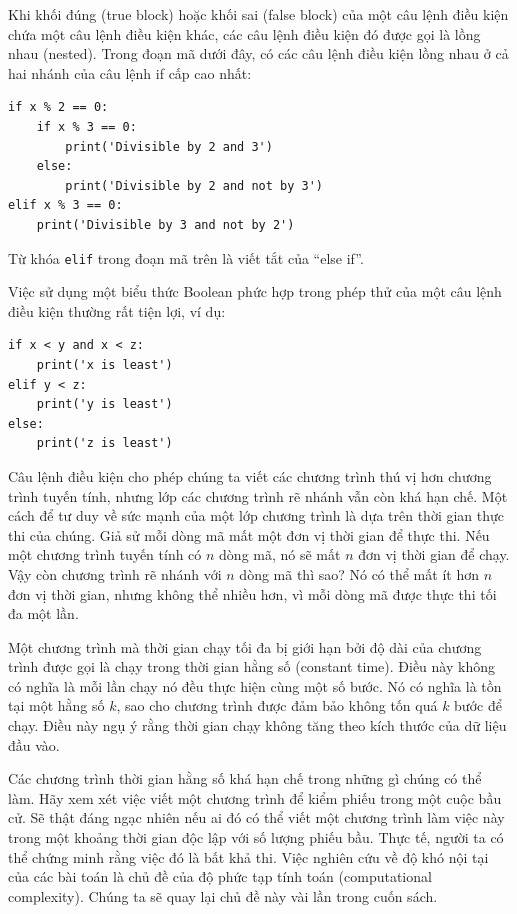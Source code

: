 Khi khối đúng (true block) hoặc khối sai (false block) của một câu lệnh điều kiện chứa một câu lệnh điều kiện khác, các câu lệnh điều kiện đó được gọi là lồng nhau (nested). Trong đoạn mã dưới đây, có các câu lệnh điều kiện lồng nhau ở cả hai nhánh của câu lệnh if cấp cao nhất:

\begin{verbatim}
if x % 2 == 0:
    if x % 3 == 0:
        print('Divisible by 2 and 3')
    else:
        print('Divisible by 2 and not by 3')
elif x % 3 == 0:
    print('Divisible by 3 and not by 2')
\end{verbatim}

Từ khóa \texttt{elif} trong đoạn mã trên là viết tắt của ``else if''.

Việc sử dụng một biểu thức Boolean phức hợp trong phép thử của một câu lệnh điều kiện thường rất tiện lợi, ví dụ:

\begin{verbatim}
if x < y and x < z:
    print('x is least')
elif y < z:
    print('y is least')
else:
    print('z is least')
\end{verbatim}

Câu lệnh điều kiện cho phép chúng ta viết các chương trình thú vị hơn chương trình tuyến tính, nhưng lớp các chương trình rẽ nhánh vẫn còn khá hạn chế. Một cách để tư duy về sức mạnh của một lớp chương trình là dựa trên thời gian thực thi của chúng. Giả sử mỗi dòng mã mất một đơn vị thời gian để thực thi. Nếu một chương trình tuyến tính có $n$ dòng mã, nó sẽ mất $n$ đơn vị thời gian để chạy. Vậy còn chương trình rẽ nhánh với $n$ dòng mã thì sao? Nó có thể mất ít hơn $n$ đơn vị thời gian, nhưng không thể nhiều hơn, vì mỗi dòng mã được thực thi tối đa một lần.

Một chương trình mà thời gian chạy tối đa bị giới hạn bởi độ dài của chương trình được gọi là chạy trong thời gian hằng số (constant time). Điều này không có nghĩa là mỗi lần chạy nó đều thực hiện cùng một số bước. Nó có nghĩa là tồn tại một hằng số $k$, sao cho chương trình được đảm bảo không tốn quá $k$ bước để chạy. Điều này ngụ ý rằng thời gian chạy không tăng theo kích thước của dữ liệu đầu vào.

Các chương trình thời gian hằng số khá hạn chế trong những gì chúng có thể làm. Hãy xem xét việc viết một chương trình để kiểm phiếu trong một cuộc bầu cử. Sẽ thật đáng ngạc nhiên nếu ai đó có thể viết một chương trình làm việc này trong một khoảng thời gian độc lập với số lượng phiếu bầu. Thực tế, người ta có thể chứng minh rằng việc đó là bất khả thi. Việc nghiên cứu về độ khó nội tại của các bài toán là chủ đề của độ phức tạp tính toán (computational complexity). Chúng ta sẽ quay lại chủ đề này vài lần trong cuốn sách.

